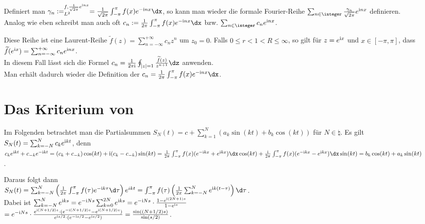 Definiert man
$\gamma_n := \sp{f, \frac{1}{\sqrt{2\pi}} e^{\i nx}}_{L^2} =
\frac{1}{\sqrt{2\pi}} \int_{-\pi}^\pi f(x) e^{-\i nx}\dx$, so kann man wieder
die formale Fourier-Reihe
$\sum_{n \in \integer} \frac{\gamma_n}{\sqrt{2\pi}} e^{\i nx}$ definieren.\\
Analog wie eben schreibt man auch oft
$c_n := \frac{1}{2\pi} \int_{-\pi}^\pi f(x) e^{-\i nx} \dx$ bzw.
$\sum_{n \in \integer} c_n e^{\i nx}$.

\linie

Diese Reihe ist eine Laurent-Reihe
$\widetilde{f}(z) = \sum_{n=-\infty}^{+\infty} c_n z^n$ um $z_0 = 0$.
Falls $0 \le r < 1 < R \le \infty$, so gilt für $z = e^{\mathrm{i} x}$ und
$x \in [-\pi, \pi]$, dass
$\widetilde{f}(e^{\mathrm{i} x}) = \sum_{n=-\infty}^{+\infty} c_n e^{\mathrm{i} nx}$.\\
In diesem Fall lässt sich die Formel
$c_n = \frac{1}{2\pi\i} \oint_{|z| = 1} \frac{\widetilde{f}(z)}{z^{n+1}}\dz$
anwenden.\\
Man erhält dadurch wieder die Definition der
$c_n = \frac{1}{2\pi} \int_{-\pi}^\pi f(x) e^{-\i nx} \dx$.

\section{%
    Das Kriterium von %
}

Im Folgenden betrachtet man die Partialsummen
$S_N(t) = c + \sum_{k=1}^N (a_k \sin(kt) + b_k \cos(kt))$ für $N \in \natural$.
Es gilt
$S_N(t) = \sum_{k=-N}^N c_k e^{\mathrm{i} kt}$,
denn\\
$c_k e^{\i kt} + c_{-k} e^{-\i kt} =
(c_k + c_{-k}) \cos(kt) + \i (c_k - c_{-k}) \sin(kt) =
\frac{1}{2\pi} \int_{-\pi}^\pi f(x) (e^{-\i kx} + e^{\i kx}) \dx \cos(kt) +
\frac{\i}{2\pi} \int_{-\pi}^\pi f(x) (e^{-\i kx} - e^{\i kx}) \dx \sin(kt) =
b_k \cos(kt) + a_k \sin(kt)$.

Daraus folgt dann\\
$S_N(t) = \sum_{k=-N}^N \left(\frac{1}{2\pi}
\int_{-\pi}^{\pi} f(\tau) e^{-\i k\tau}\d\tau\right) e^{ikt}
= \int_{-\pi}^{\pi} f(\tau)
\left(\frac{1}{2\pi} \sum_{k=-N}^N e^{\i k(t - \tau)}\right)\d\tau$.\\
Dabei ist
$\sum_{k=-N}^N e^{\mathrm{i} ks} =
e^{-\mathrm{i} Ns} \sum_{k=0}^{2N} e^{\mathrm{i} ks} =
e^{-\mathrm{i} Ns} \cdot
\frac{1 - e^{\mathrm{i} (2N + 1)s}}{1 - e^{\mathrm{i} s}}$\\
$= e^{-\mathrm{i} Ns} \cdot
\frac{e^{\mathrm{i} (N + 1/2)s} \cdot
(e^{-\mathrm{i} (N + 1/2)s} - e^{\mathrm{i} (N + 1/2)s})}
{e^{\mathrm{i} s/2} \cdot (e^{-\mathrm{i} s/2} - e^{\mathrm{i} s/2})} =
\frac{\sin((N + 1/2) s)}{\sin(s/2)}$.

